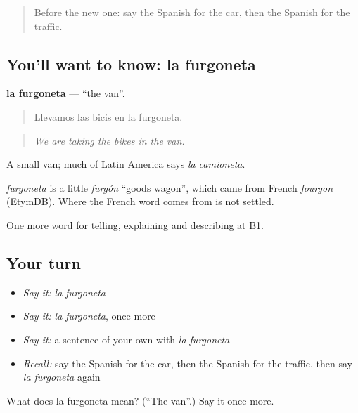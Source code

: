 \begin{quote}
Before the new one: say the Spanish for the car, then the Spanish for the traffic.
\end{quote}

\subsection*{You'll want to know: la furgoneta}
\textbf{la furgoneta} — \textquotedblleft{}the van\textquotedblright{}.

\begin{quote}
Llevamos las bicis en la furgoneta.
\end{quote}

\begin{quote}
\emph{We are taking the bikes in the van.}
\end{quote}

A small van; much of Latin America says \emph{la camioneta}.

\begin{cousinweb}
\emph{furgoneta} is a little \emph{furgón} \textquotedblleft{}goods wagon\textquotedblright{}, which came from French \emph{fourgon} (EtymDB). Where the French word comes from is not settled.
\end{cousinweb}

\begin{grammarlens}[title={What you've built}]
One more word for telling, explaining and describing at B1.
\end{grammarlens}

\subsection*{Your turn}
\begin{itemize}
\raggedright
  \item \emph{Say it:} \emph{la furgoneta}
  \item \emph{Say it:} \emph{la furgoneta}, once more
  \item \emph{Say it:} a sentence of your own with \emph{la furgoneta}
  \item \emph{Recall:} say the Spanish for the car, then the Spanish for the traffic, then say \emph{la furgoneta} again
\end{itemize}

\begin{tcolorbox}[breakable,colback=teal!4,colframe=teal!35!black,title={Before you move on}]
What does la furgoneta mean? (\textquotedblleft{}The van\textquotedblright{}.) Say it once more.
\end{tcolorbox}
